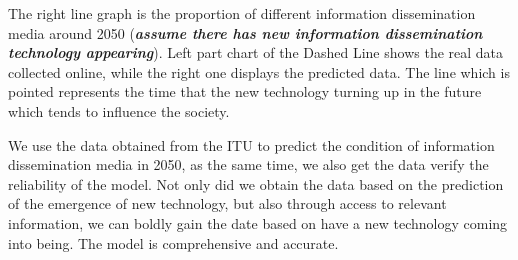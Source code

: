 \documentclass[a4paper,11pt]{article}
\begin{document}
\par The right line graph is the proportion of different information dissemination media around 2050 (\textbf{\emph{assume there has new information dissemination technology appearing}}). Left part chart of the Dashed Line shows the real data collected online, while the right one displays the predicted data. The line which is pointed represents the time that the new technology turning up in the future which tends to influence the society.

\par We use the data obtained from the ITU to predict the condition of information dissemination media in 2050, as the same time, we also get the data verify the reliability of the model. Not only did we obtain the data based on the prediction of the emergence of new technology, but also through access to relevant information, we can boldly gain the date based on have a new technology coming into being. The model is comprehensive and accurate.
\end{document}

